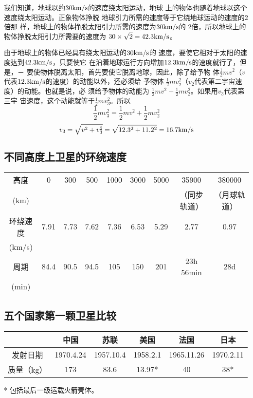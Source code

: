 我们知道，地球以约$30{\rm km/s}$的速度绕太阳运动，地球
上的物体也随着地球以这个速度绕太阳运动。正象物体挣脱
地球引力所需的速度等于它绕地球运动的速度的2倍那
样，地球上的物体挣脱太阳引力所需的速度为$30{\rm km/s}$的
2倍，所以地球上的物体挣脱太阳引力所需要的速度为
$30\times\sqrt{2}=42.3{\rm km/s}$。

由于地球上的物体已经具有绕太阳运动的$30{\rm km/s}$的
速度，要使它相对于太阳的速度达到$42.3{\rm km/s}$，只要使它
在沿着地球运行方向增加$12.3{\rm km/s}$的速度就行了，但是，－
要使物体脱离太阳，首先要使它脱离地球，因此，除了给予物
体$\frac{1}{2}mv^2$（$v$代表$12.3{\rm km/s}$的速度）的动能以外，还必须给
予物体
$\frac{1}{2}mv^2_2$（$v_2$代表第二宇宙速度）的动能。也就是说，必
须给予物体的动能为
$\frac{1}{2}mv^2+\frac{1}{2}mv^2_2$。如果用$v_3$代表第三宇
宙速度，这个动能就等于$\frac{1}{2}mv^2_3$。所以
\[\frac{1}{2}mv^2_3=\frac{1}{2}mv^2+\frac{1}{2}mv^2_2\]
\[v_3=\sqrt{v^2+v^2_3}=\sqrt{12.3^2+11.2^2}=16.7{\rm km/s}\]

\subsection{不同高度上卫星的环绕速度}

\begin{center}
\begin{tabular}{ccccccccc}
\hline
高度& 0&300&500&1000&3000&5000&35900& 380000\\
(km) &&&&&&&（同步轨道）  &（月球轨道）\\
\hline
环绕速度 &7.91&7.73&7.62&7.36&6.53&5.29&2.77&0.97\\
(km/s)\\
周期&84.4&90.5&94.5&105&150&201&23h 56min&28d\\
(min)\\
\hline
\end{tabular}
\end{center}

\subsection{五个国家第一颗卫星比较}
\begin{center}
\begin{tabular}{cccccc}
\hline
&中国&苏联&美国&法国&日本\\
\hline
发射日期&1970.4.24&1957.10.4&1958.2.1&1965.11.26&1970.2.11\\
质量（kg）&173&83.6&13.97*&40&38*\\
\hline
\end{tabular}

* 包括最后一级运载火箭壳体。
\end{center}

